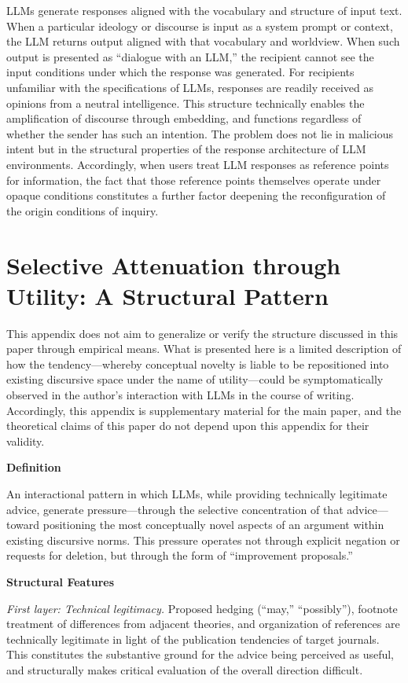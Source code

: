 \documentclass[12pt]{article}
\begin{document}
LLMs generate responses aligned with the vocabulary and structure of input text. When a particular ideology or discourse is input as a system prompt or context, the LLM returns output aligned with that vocabulary and worldview. When such output is presented as ``dialogue with an LLM,'' the recipient cannot see the input conditions under which the response was generated. For recipients unfamiliar with the specifications of LLMs, responses are readily received as opinions from a neutral intelligence. This structure technically enables the amplification of discourse through embedding, and functions regardless of whether the sender has such an intention. The problem does not lie in malicious intent but in the structural properties of the response architecture of LLM environments. Accordingly, when users treat LLM responses as reference points for information, the fact that those reference points themselves operate under opaque conditions constitutes a further factor deepening the reconfiguration of the origin conditions of inquiry.

\section{Selective Attenuation through Utility: A Structural Pattern}

This appendix does not aim to generalize or verify the structure discussed in this paper through empirical means. What is presented here is a limited description of how the tendency---whereby conceptual novelty is liable to be repositioned into existing discursive space under the name of utility---could be symptomatically observed in the author's interaction with LLMs in the course of writing. Accordingly, this appendix is supplementary material for the main paper, and the theoretical claims of this paper do not depend upon this appendix for their validity.

\noindent\textbf{Definition}

An interactional pattern in which LLMs, while providing technically legitimate advice, generate pressure---through the selective concentration of that advice---toward positioning the most conceptually novel aspects of an argument within existing discursive norms. This pressure operates not through explicit negation or requests for deletion, but through the form of ``improvement proposals.''

\noindent\textbf{Structural Features}

\textit{First layer: Technical legitimacy.} Proposed hedging (``may,'' ``possibly''), footnote treatment of differences from adjacent theories, and organization of references are technically legitimate in light of the publication tendencies of target journals. This constitutes the substantive ground for the advice being perceived as useful, and structurally makes critical evaluation of the overall direction difficult.
\end{document}
